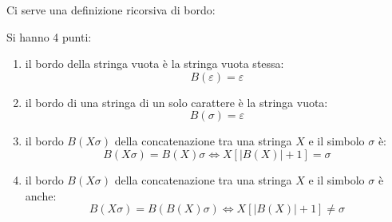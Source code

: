 \documentclass[a4paper,12pt, oneside]{book}
\begin{document}
Ci serve una definizione ricorsiva di bordo:
\begin{definizione}
  Si hanno 4 punti:
  \begin{enumerate}
    \item il bordo della stringa vuota è la stringa vuota stessa:
    \[B(\varepsilon)=\varepsilon\]
    \item il bordo di una stringa di un solo carattere è la stringa vuota:
    \[B(\sigma)=\varepsilon\]
    
    \item il bordo $B(X\sigma)$ della concatenazione tra una stringa $X$ e il
    simbolo $\sigma$ è:
    \[B(X\sigma)=B(X)\sigma\iff X[|B(X)|+1]=\sigma\]
    \item il bordo $B(X\sigma)$ della concatenazione tra una stringa $X$ e il
    simbolo $\sigma$ è anche:
    \[B(X\sigma)= B(B(X)\sigma)\iff X[|B(X)|+1]\neq\sigma\]
  \end{enumerate}
\end{definizione}
\end{document}
